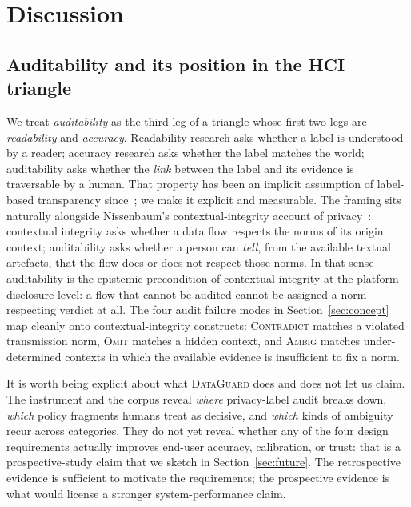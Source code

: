 \documentclass[11pt,a4paper]{article}
\newcommand{\dataguard}{\textsc{DataGuard}}
\begin{document}
\section{Discussion}
\label{sec:discussion}
\subsection{Auditability and its position in the HCI triangle}
\label{sec:disc-triangle}
We treat \emph{auditability} as the third leg of a triangle whose
first two legs are \emph{readability} and \emph{accuracy}. Readability
research asks whether a label is understood by a reader; accuracy
research asks whether the label matches the world; auditability asks
whether the \emph{link} between the label and its evidence is
traversable by a human. That property has been an implicit assumption
of label-based transparency since~\citet{kelley2009nutrition}; we
make it explicit and measurable. The framing sits naturally alongside
Nissenbaum's contextual-integrity account of
privacy~\citep{nissenbaum2004privacy}: contextual integrity asks
whether a data flow respects the norms of its origin context;
auditability asks whether a person can \emph{tell}, from the available
textual artefacts, that the flow does or does not respect those
norms. In that sense auditability is the epistemic precondition of
contextual integrity at the platform-disclosure level: a flow that
cannot be audited cannot be assigned a norm-respecting verdict at all.
The four audit failure modes in Section~\ref{sec:concept} map cleanly
onto contextual-integrity constructs: \textsc{Contradict} matches a
violated transmission norm, \textsc{Omit} matches a hidden context, and
\textsc{Ambig} matches under-determined contexts in which the available
evidence is insufficient to fix a norm.

It is worth being explicit about what \dataguard{} does and does not
let us claim. The instrument and the corpus reveal \emph{where}
privacy-label audit breaks down, \emph{which} policy fragments humans
treat as decisive, and \emph{which} kinds of ambiguity recur across
categories. They do not yet reveal whether any of the four design
requirements actually improves end-user accuracy, calibration, or
trust: that is a prospective-study claim that we sketch in
Section~\ref{sec:future}. The retrospective evidence is sufficient to
motivate the requirements; the prospective evidence is what would
license a stronger system-performance claim.
\end{document}
